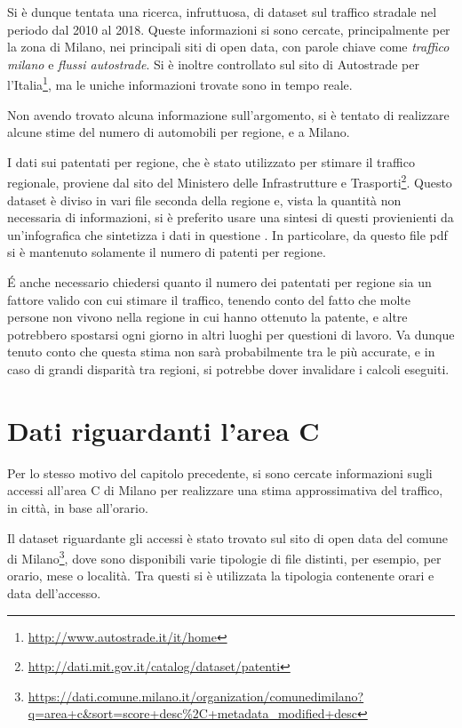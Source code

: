 \documentclass[a4paper,12pt]{report}
\newcommand{\quotestyle}[1]{\textit{#1}}
\begin{document}
Si è dunque tentata una ricerca, infruttuosa, di dataset sul traffico stradale nel periodo 
dal 2010 al 2018.
Queste informazioni si sono cercate, principalmente per la zona di Milano, nei principali 
siti di open data, con parole chiave come \quotestyle{traffico milano} e 
\quotestyle{flussi autostrade}. 
Si è inoltre controllato sul sito di Autostrade per 
l'Italia\footnote{\url{http://www.autostrade.it/it/home}}, 
ma le uniche informazioni trovate sono in tempo reale.

Non avendo trovato alcuna informazione sull'argomento, si è tentato di realizzare 
alcune stime del numero di automobili per regione, e a Milano.

I dati sui patentati per regione, che è stato utilizzato per stimare il traffico 
regionale, proviene dal sito del Ministero delle Infrastrutture e 
Trasporti\footnote{\url{http://dati.mit.gov.it/catalog/dataset/patenti}}.
Questo dataset è diviso in vari file seconda della regione e, vista la quantità 
non necessaria di informazioni, si è preferito usare una sintesi di questi provienienti da 
un'infografica che sintetizza i dati in questione \cite{INFOGRAFICA_MIT:1}.
In particolare, da questo file pdf si è mantenuto solamente il numero di patenti per regione.

\'E anche necessario chiedersi quanto il numero dei patentati per regione sia un 
fattore valido con cui stimare il traffico, tenendo conto del fatto che molte 
persone non vivono nella regione 
in cui hanno ottenuto la patente, e altre potrebbero spostarsi ogni giorno in altri 
luoghi per questioni di lavoro. 
Va dunque tenuto conto che questa stima non sarà probabilmente tra le più accurate, 
e in caso di grandi disparità tra regioni, si potrebbe dover invalidare i calcoli eseguiti.

\section{Dati riguardanti l'area C}

Per lo stesso motivo del capitolo precedente, si sono cercate informazioni sugli 
accessi all'area C di Milano per realizzare una stima approssimativa del traffico, in 
città, in base all'orario.

Il dataset riguardante gli accessi è stato trovato sul sito di open data del comune di 
Milano\footnote{\url{https://dati.comune.milano.it/organization/comunedimilano?q=area+c&sort=score+desc\%2C+metadata_modified+desc}}, 
dove sono disponibili varie tipologie di file distinti, per esempio, per orario, 
mese o località. 
Tra questi si è utilizzata la tipologia contenente orari e data dell'accesso.
\end{document}
